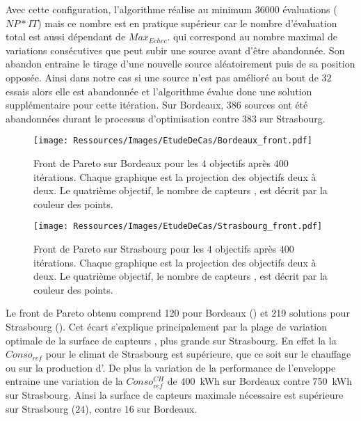 Avec cette configuration, l’algorithme réalise au minimum \num{36000} évaluations ($NP * IT$)
mais ce nombre est en pratique supérieur car le nombre d’évaluation total est aussi dépendant de $Max_{Echec}$.
qui correspond au nombre maximal de variations consécutives que peut subir une source avant
d’être abandonnée. Son abandon entraine le tirage d’une nouvelle source aléatoirement
puis de sa position opposée. Ainsi dans notre cas si une source n’est pas amélioré
au bout de $32$ essais alors elle est abandonnée et l’algorithme évalue donc une
solution supplémentaire pour cette itération. Sur Bordeaux, $386$ sources ont été abandonnées
durant le processus d’optimisation contre $383$ sur Strasbourg.


\begin{figure}
    \centering
    \texttt{[image: Ressources/Images/EtudeDeCas/Bordeaux\_front.pdf]}
    \caption[Front de Pareto sur Bordeaux pour les $4$ objectifs après $400$ itérations]
             {Front de Pareto sur Bordeaux pour les $4$ objectifs après $400$ itérations.
              Chaque graphique est la projection des objectifs deux à deux.
              Le quatrième objectif, le nombre de capteurs , est décrit par la couleur des points.}
    \label{fig:front_pareto_bordeaux}
\end{figure}

\begin{figure}
    \centering
    \texttt{[image: Ressources/Images/EtudeDeCas/Strasbourg\_front.pdf]}
    \caption[Front de Pareto sur Strasbourg pour les $4$ objectifs après $400$ itérations]
             {Front de Pareto sur Strasbourg pour les $4$ objectifs après $400$ itérations.
              Chaque graphique est la projection des objectifs deux à deux.
              Le quatrième objectif, le nombre de capteurs , est décrit par la couleur des points.}
    \label{fig:front_pareto_strasbourg}
\end{figure}


Le front de Pareto obtenu comprend \num{120} pour Bordeaux ()
et \num{219} solutions pour Strasbourg (). Cet écart s’explique
principalement par la plage de variation optimale de la surface de capteurs , plus grande
sur Strasbourg. En effet la la $Conso_{ref}$ pour le climat de Strasbourg est supérieure, que ce
soit sur le chauffage ou sur la production d’.
De plus la variation de la performance de l’enveloppe entraine une variation de
la $Conso_{ref}^{CH}$ de \SI{400}{kWh} sur Bordeaux contre \SI{750}{kWh} sur Strasbourg.
Ainsi la surface de capteurs  maximale nécessaire est supérieure sur Strasbourg ($24$),
contre $16$ sur Bordeaux.

